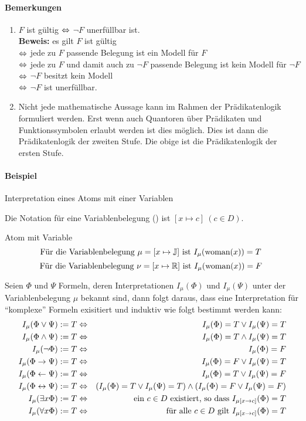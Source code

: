 \documentclass[a4paper,twoside,DIV15,BCOR12mm]{scrbook}
\begin{document}
\paragraph{Bemerkungen}
\begin{enumerate}
\item $F$ ist gültig $\Leftrightarrow$ $\neg F$ unerfüllbar ist.\\ \textbf{Beweis:} es gilt $F$ ist gültig 
	\\$\Leftrightarrow$ jede zu $F$ passende Belegung ist ein Modell für $F$ 
	\\$\Leftrightarrow$ jede zu $F$ und damit auch zu $\neg F$ passende Belegung ist kein Modell für $\neg F$ 
	\\$\Leftrightarrow$ $\neg F$ besitzt kein Modell 
	\\$\Leftrightarrow$ $\neg F$ ist unerfüllbar.
\item Nicht jede mathematische Aussage kann im Rahmen der Prädikatenlogik formuliert werden. Erst wenn auch Quantoren über Prädikaten und Funktionssymbolen erlaubt werden ist dies möglich. Dies ist dann die Prädikatenlogik der zweiten Stufe. Die obige ist die Prädikatenlogik der ersten Stufe.
\end{enumerate}

\paragraph{Beispiel} Interpretation eines Atoms mit einer Variablen 

Die Notation für eine Variablenbelegung () ist $[x \mapsto c] \ (c \in D)$.

Atom mit Variable
	$$\text{Für die Variablenbelegung $\mu=[x \mapsto \mathbb{J}] \text{ ist } I_\mu(\text{woman}(x))=T$ }$$
	$$\text{Für die Variablenbelegung $\nu=[x \mapsto \mathbb{R}] \text{ ist } I_\mu(\text{woman}(x))=F$ }$$

Seien $\Phi$ und $\Psi$ Formeln, deren Interpretationen $I_\mu(\Phi)$ und $I_\mu(\Psi)$ unter der Variablenbelegung $\mu$ bekannt sind, dann folgt daraus, dass eine Interpretation für "`komplexe"' Formeln exisitiert und induktiv wie folgt bestimmt werden kann:
\begin{eqnarray*}
I_\mu(\Phi \vee \Psi) := T & \Leftrightarrow & I_\mu(\Phi)=T \vee I_\mu(\Psi)=T \\
I_\mu(\Phi \wedge \Psi) := T & \Leftrightarrow & I_\mu(\Phi)=T \wedge I_\mu(\Psi)=T \\
I_\mu(\neg \Phi) := T & \Leftrightarrow & I_\mu(\Phi)=F \\
I_\mu(\Phi \rightarrow \Psi) := T & \Leftrightarrow & I_\mu(\Phi)=F \vee I_\mu(\Psi)=T \\
I_\mu(\Phi \leftarrow \Psi) := T & \Leftrightarrow & I_\mu(\Phi)=T \vee I_\mu(\Psi)=F \\
I_\mu(\Phi \leftrightarrow \Psi) := T & \Leftrightarrow & (I_\mu(\Phi)=T \vee I_\mu(\Psi)=T) \wedge (I_\mu(\Phi)=F \vee I_\mu(\Psi)=F) \\
I_\mu(\exists x \Phi) := T & \Leftrightarrow & \text{ein $c \in D$ existiert, so dass $I_{\mu[x \rightarrow c]}(\Phi) = T$} \\
I_\mu(\forall x \Phi) := T & \Leftrightarrow & \text{für alle $c \in D$ gilt $I_{\mu[x \rightarrow c]}(\Phi) = T$}
\end{eqnarray*}
\end{document}
